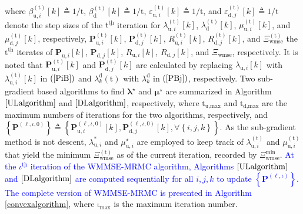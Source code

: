 \documentclass[9pt,journal]{IEEEtran}
\newcommand{\paren}[1]{\left({#1}\right)}
\newcommand{\bracket}[1]{{\left [{#1}\right ]}}
\newcommand{\braces}[1]{{\left\{ {#1}\right\}}}
\newcommand{\ith}[1]    {{#1}^{\underline{\text{th}}}}
\newcommand{\PiB}{\mathbf{P}_{\textrm{u},i}\bracket{k}}
\newcommand{\PBj}{\mathbf{P}_{\textrm{d},j}\bracket{k}}
\newcommand{\sfrac}[2]{#1/#2}
\theoremstyle{definition}
\begin{document}
where $\beta^{\paren{\mathrm{t}}}_{\textrm{u},i}\bracket{k}\triangleq\sfrac{1}{\mathrm{t}}$, $\beta^{\paren{\mathrm{t}}}_{\textrm{d}}\bracket{k}\triangleq\sfrac{1}{\mathrm{t}}$, $\varepsilon^{\paren{\mathrm{t}}}_{\textrm{u},i}\bracket{k}\triangleq\sfrac{1}{\mathrm{t}}$, and $\varepsilon^{\paren{\mathrm{t}}}_{\textrm{d},j}\bracket{k}\triangleq\sfrac{1}{\mathrm{t}}$ denote the step sizes of the $\ith{\mathrm{t}}$ iteration for $\lambda^{\paren{\mathrm{t}}}_{\textrm{u},i}\bracket{k}$, $\lambda^{\paren{\mathrm{t}}}_{\textrm{d}}\bracket{k}$, $\mu^{\paren{\mathrm{t}}}_{\textrm{u},i}\bracket{k}$, and $\mu^{\paren{\mathrm{t}}}_{\textrm{d},j}\bracket{k}$, respectively, $\mathbf{P}^{\paren{\mathrm{t}}}_{\textrm{u},i}\bracket{k}$, $\mathbf{P}^{\paren{\mathrm{t}}}_{\textrm{d},j}\bracket{k}$, $\mathit{R}^{\paren{\mathrm{t}}}_{\textrm{u},i}\bracket{k}$, $\mathit{R}^{\paren{\mathrm{t}}}_{\textrm{d},j}\bracket{k}$, and $\Xi^{\paren{\mathrm{t}}}_{\textrm{wmse}}$ the $\ith{\mathrm{t}}$ iterates of $\PiB$, $\PBj$, $\mathit{R}_{\textrm{u},i}\bracket{k}$, $\mathit{R}_{\textrm{d},j}\bracket{k}$, and $\Xi_{\textrm{wmse}}$, respectively. It is noted that $\mathbf{P}^{\paren{\mathrm{t}}}_{\textrm{u},i}\bracket{k}$ and $\mathbf{P}^{\paren{\mathrm{t}}}_{\textrm{d},j}\bracket{k}$ are calculated by replacing $\lambda_{\textrm{u},i}\bracket{k}$ with $\lambda^{\paren{\mathrm{t}}}_{\textrm{u},i}\bracket{k}$ in $\paren{\mathrm{\ref{PiB}}}$ and $\lambda^{\textrm{d}}_{k}\paren{\mathrm{t}}$ with $\lambda^{\textrm{d}}_{k}$ in $\paren{\mathrm{\ref{PBj}}}$, respectively. %
Two sub-gradient based algorithms to find $\boldsymbol{\lambda}^\star$ and $\boldsymbol{\mu}^\star$ are summarized in Algorithm $\ref{ULalgorithm}$ and $\ref{DLalgorithm}$, respectively, where $\mathrm{t}_{\textrm{u,max}}$ and $\mathrm{t}_{\textrm{d,max}}$ are the maximum numbers of iterations for the two algorithms, respectively, and $\braces{\mathbf{P}^{\paren{\ell,\iota,0}}}\triangleq\braces{\mathbf{P}^{\paren{\ell,\iota,0}}_{\textrm{u},i}\bracket{k},\mathbf{P}^{\paren{\ell,\iota,0}}_{\textrm{d},j}\bracket{k},\forall \braces{i,j,k}}$. As the sub-gradient method is not descent, $\lambda^{\ast}_{\textrm{u},i}$ and $\mu^\star_{\textrm{u},i}$ are employed to keep track of $\lambda^{\paren{\mathrm{t}}}_{\textrm{u},i}$ and $\mu^{\paren{\mathrm{t}}}_{\textrm{u},i}$ that yield the minimum $\Xi^{\paren{\mathrm{t}}}_{\textrm{wmse}}$ as of the current iteration, recorded by $\Xi^{\textrm{min}}_{\textrm{wmse}}$.  \textcolor{blue}{At the $\ith{\iota}$ iteration of the WMMSE-MRMC algorithm, Algorithms $\ref{ULalgorithm}$ and $\ref{DLalgorithm}$ are computed sequentially for all $i,j,k$ to update $\braces{\mathbf{P}^{\paren{\ell,\iota}}}$. The complete version of WMMSE-MRMC is presented in Algorithm \ref{convexalgorithm},} where $\mathrm{\iota}_{\textrm{max}}$ is the maximum iteration number.
\end{document}
